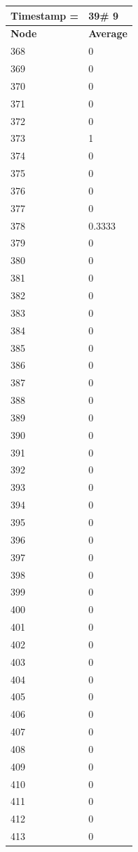 \begin{tabular}{|l||l|}
\hline
\textbf{Timestamp =} & \textbf{39}\# 9\\\hline
	\textbf{Node} & \textbf{Average} \\ \hline
\hline
	368 & 0 \\ \hline
	369 & 0 \\ \hline
	370 & 0 \\ \hline
	371 & 0 \\ \hline
	372 & 0 \\ \hline
	373 & 1 \\ \hline
	374 & 0 \\ \hline
	375 & 0 \\ \hline
	376 & 0 \\ \hline
	377 & 0 \\ \hline
	378 & 0.3333 \\ \hline
	379 & 0 \\ \hline
	380 & 0 \\ \hline
	381 & 0 \\ \hline
	382 & 0 \\ \hline
	383 & 0 \\ \hline
	384 & 0 \\ \hline
	385 & 0 \\ \hline
	386 & 0 \\ \hline
	387 & 0 \\ \hline
	388 & 0 \\ \hline
	389 & 0 \\ \hline
	390 & 0 \\ \hline
	391 & 0 \\ \hline
	392 & 0 \\ \hline
	393 & 0 \\ \hline
	394 & 0 \\ \hline
	395 & 0 \\ \hline
	396 & 0 \\ \hline
	397 & 0 \\ \hline
	398 & 0 \\ \hline
	399 & 0 \\ \hline
	400 & 0 \\ \hline
	401 & 0 \\ \hline
	402 & 0 \\ \hline
	403 & 0 \\ \hline
	404 & 0 \\ \hline
	405 & 0 \\ \hline
	406 & 0 \\ \hline
	407 & 0 \\ \hline
	408 & 0 \\ \hline
	409 & 0 \\ \hline
	410 & 0 \\ \hline
	411 & 0 \\ \hline
	412 & 0 \\ \hline
	413 & 0 \\ \hline
\end{tabular}

